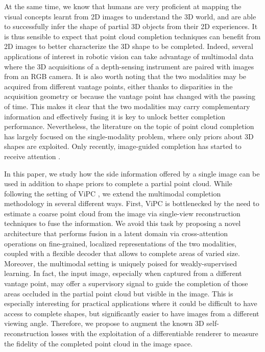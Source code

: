 \documentclass{article}
\begin{document}
At the same time, we know that humans are very proficient at mapping the visual concepts learnt from 2D images to understand the 3D world, and are able to successfully infer the shape of partial 3D objects from their 2D experiences. It is thus sensible to expect that point cloud completion techniques can benefit from 2D images to better characterize the 3D shape to be completed. Indeed, several applications of interest in robotic vision can take advantage of multimodal data where the 3D acquisitions of a depth-sensing instrument are paired with images from an RGB camera. It is also worth noting that the two modalities may be acquired from different vantage points, either thanks to disparities in the acquisition geometry or because the vantage point has changed with the passing of time. This makes it clear that the two modalities may carry complementary information and effectively fusing it is key to unlock better completion performance.
Nevertheless, the literature on the topic of point cloud completion \cite{pcn,topnet,atlas,ecg,vrc,pointtr,crn,selfsup} has largely focused on the single-modality problem, where only priors about 3D shapes are exploited. Only recently, image-guided completion has started to receive attention \cite{vipc}.

In this paper, we study how the side information offered by a single image can be used in addition to shape priors to complete a partial point cloud. While following the setting of ViPC \cite{vipc}, we extend the multimodal completion methodology in several different ways. First, ViPC \cite{vipc} is bottlenecked by the need to estimate a coarse point cloud from the image via single-view reconstruction techniques to fuse the information. We avoid this task by proposing a novel architecture that performs fusion in a latent domain via cross-attention operations on fine-grained, localized representations of the two modalities, coupled with a flexible decoder that allows to complete areas of varied size. Moreover, the multimodal setting is uniquely poised for weakly-supervised learning. In fact, the input image, especially when captured from a different vantage point, may offer a supervisory signal to guide the completion of those areas occluded in the partial point cloud but visible in the image. This is especially interesting for practical applications where it could be difficult to have access to complete shapes, but significantly easier to have images from a different viewing angle. Therefore, we propose to augment the known 3D self-reconstruction losses with the exploitation of a differentiable renderer to measure the fidelity of the completed point cloud in the image space.
\end{document}
